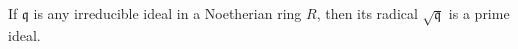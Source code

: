 If $\mathfrak{q}$ is any irreducible ideal in a Noetherian ring $R$, then its radical $\sqrt{\mathfrak{q}}$ is a prime ideal.
